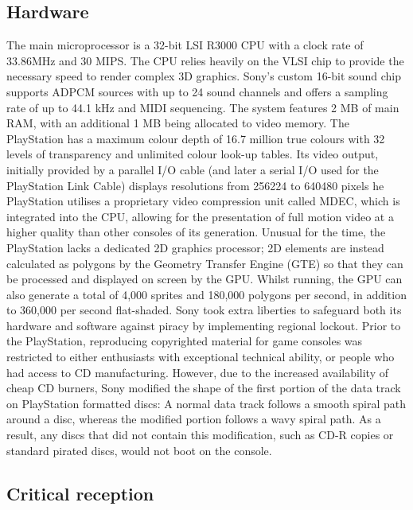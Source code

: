 \documentclass[a4paper,10pt]{book}
\begin{document}
 \subsection{Hardware }
 
          The main microprocessor is a 32-bit LSI R3000 CPU with a clock rate of 33.86MHz and 30 MIPS. The CPU relies heavily on the VLSI chip to provide the necessary speed to render complex 3D graphics. Sony's custom 16-bit sound chip supports ADPCM sources with up to 24 sound channels and offers a sampling rate of up to 44.1 kHz and MIDI sequencing. The system features 2 MB of main RAM, with an additional 1 MB being allocated to video memory. The PlayStation has a maximum colour depth of 16.7 million true colours with 32 levels of transparency and unlimited colour look-up tables. Its video output, initially provided by a parallel I/O cable (and later a serial I/O used for the PlayStation Link Cable) displays resolutions from 256224 to 640480 pixels  
          he PlayStation utilises a proprietary video compression unit called MDEC, which is integrated into the CPU, allowing for the presentation of full motion video at a higher quality than other consoles of its generation. Unusual for the time, the PlayStation lacks a dedicated 2D graphics processor; 2D elements are instead calculated as polygons by the Geometry Transfer Engine (GTE) so that they can be processed and displayed on screen by the GPU. Whilst running, the GPU can also generate a total of 4,000 sprites and 180,000 polygons per second, in addition to 360,000 per second flat-shaded. 
          Sony took extra liberties to safeguard both its hardware and software against piracy by implementing regional lockout. Prior to the PlayStation, reproducing copyrighted material for game consoles was restricted to either enthusiasts with exceptional technical ability, or people who had access to CD manufacturing. However, due to the increased availability of cheap CD burners, Sony modified the shape of the first portion of the data track on PlayStation formatted discs: A normal data track follows a smooth spiral path around a disc, whereas the modified portion follows a wavy spiral path. As a result, any discs that did not contain this modification, such as CD-R copies or standard pirated discs, would not boot on the console.
         
 \subsection{Critical reception }
 
\end{document}
